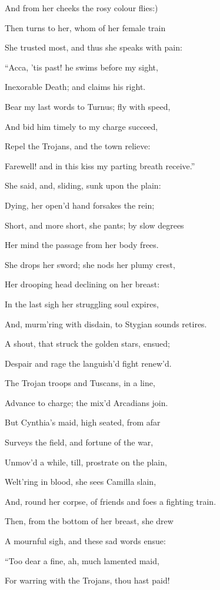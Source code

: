 And from her cheeks the rosy colour flies:)

Then turns to her, whom of her female train

She trusted most, and thus she speaks with pain:

“Acca, ’tis past! he swims before my sight,

Inexorable Death; and claims his right.

Bear my last words to Turnus; fly with speed,

And bid him timely to my charge succeed,

Repel the Trojans, and the town relieve:

Farewell! and in this kiss my parting breath receive.”

She said, and, sliding, sunk upon the plain:

Dying, her open’d hand forsakes the rein;

Short, and more short, she pants; by slow degrees

Her mind the passage from her body frees.

She drops her sword; she nods her plumy crest,

Her drooping head declining on her breast:

In the last sigh her struggling soul expires,

And, murm’ring with disdain, to Stygian sounds retires.

A shout, that struck the golden stars, ensued;

Despair and rage the languish’d fight renew’d.

The Trojan troops and Tuscans, in a line,

Advance to charge; the mix’d Arcadians join.

But Cynthia’s maid, high seated, from afar

Surveys the field, and fortune of the war,

Unmov’d a while, till, prostrate on the plain,

Welt’ring in blood, she sees Camilla slain,

And, round her corpse, of friends and foes a fighting train.

Then, from the bottom of her breast, she drew

A mournful sigh, and these sad words ensue:

“Too dear a fine, ah, much lamented maid,

For warring with the Trojans, thou hast paid!

